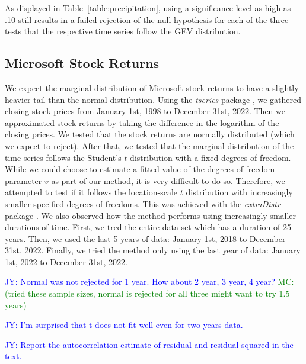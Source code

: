 \documentclass[12pt, titlepage, letterpaper]{article}
\newcommand{\jy}[1]{\textcolor{blue}{JY: #1}}
\newcommand{\mc}[1]{\textcolor{green}{MC: (#1)}}
\begin{document}
{As displayed in Table~\ref{table:precipitation}, using a significance level as 
high as .10 still results in a failed rejection
of the null hypothesis for each of the three tests that the respective 
time series follow the GEV distribution.

\subsection{Microsoft Stock Returns}
\label{sec:microsoft}


We expect the marginal distribution of Microsoft stock returns to have a 
slightly
heavier tail than the normal distribution. Using the \textsl{tseries} package 
\citep{tseries}, 
we gathered closing stock prices from January 1st, 1998 to December 31st, 2022.
Then we approximated stock returns by taking the difference in the logarithm 
of the closing prices.
We tested that the stock returns are normally
distributed (which we expect to reject).  After that, we tested that the
marginal distribution of the time series follows the Student's $t$ distribution
with a fixed degrees of freedom.
While we 
could choose to estimate a fitted value of the degrees of freedom parameter $v$
as
part of our method, it is very difficult to do so. Therefore, we attempted to
test 
if it follows
the location-scale $t$ distribution with increasingly smaller specified degrees 
of freedoms. This was achieved with the \textsl{extraDistr} 
package \citep{extraDistr}. We
also observed how the method performs using increasingly smaller durations of
time. First, we tred the entire data set which has a duration of 25 years. Then,
we used the last 5 years of data: January 1st, 2018 to December 31st, 2022.
Finally, we tried the method only using the last year of data: January 1st, 2022
to December 31st, 2022.




\jy{Normal was not rejected for 1 year. How about 2 year, 3 year, 4 year?}
\mc{tried these sample sizes, normal is rejected for all three might want to
  try 1.5 years}

\jy{I'm surprised that t does not fit well even for two years data.}

\jy{Report the autocorrelation estimate of residual and residual squared in the
  text.}



}
\end{document}
